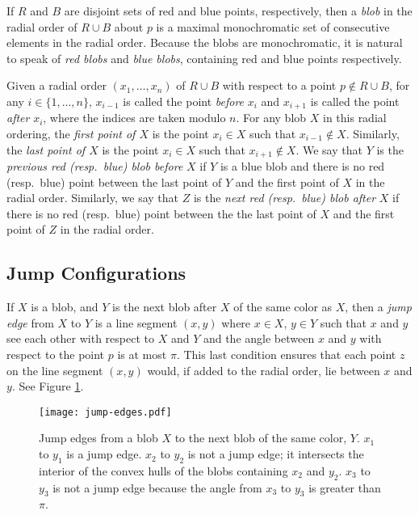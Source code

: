 \documentclass[12pt]{article}
\theoremstyle{definition}
\begin{document}
If $R$ and $B$ are disjoint sets of red and blue points, respectively, then a
\emph{blob} in the radial order of $R\cup B$ about $p$ is a maximal
monochromatic set of consecutive elements in the radial order.
Because the blobs are monochromatic, it is natural to speak of \emph{red blobs} and \emph{blue blobs}, containing red and blue points respectively.

Given a radial order $(x_1,\ldots,x_n)$ of $R\cup B$ with respect to a point $p\not\in R\cup B$, for any $i\in\{1,\ldots,n\}$, $x_{i-1}$ is called the point \emph{before} $x_i$ and $x_{i+1}$ is called the point \emph{after} $x_i$, where the indices are taken modulo $n$.
For any blob $X$ in this radial ordering, the \emph{first point of $X$} is the point $x_i\in X$ such that $x_{i-1}\not\in X$.
Similarly, the \emph{last point of $X$} is the point $x_i \in X$ such that $x_{i+1}\not\in X$.
We say that $Y$ is the \emph{previous red (resp.\ blue) blob before} $X$ if $Y$ is a blue blob and there is no red (resp.\ blue) point between the last point of $Y$ and the first point of $X$ in the radial order.
Similarly, we say that $Z$ is the \emph{next red (resp.\ blue) blob after} $X$ if there is no red (resp.\ blue) point between the the last point of $X$ and the first point of $Z$ in the radial order.

\subsection{Jump Configurations}
If $X$ is a blob, and $Y$ is the next blob after $X$ of the same color as $X$, then a \emph{jump edge} from $X$ to $Y$ is a line segment $(x,y)$ where $x\in X$, $y\in Y$ such that $x$ and $y$ see each other with respect to $X$ and $Y$ and the angle between $x$ and $y$ with respect to the point $p$ is at most $\pi$.
This last condition ensures that each point $z$ on the line segment $(x,y)$ would, if added to the radial order, lie between $x$ and $y$. See Figure \ref{fig:jump-edges}.



\begin{figure}[h]
\centering
\texttt{[image: jump-edges.pdf]}
\caption{Jump edges from a blob $X$ to the next blob of the same color, $Y$. $x_1$ to $y_1$ is a jump edge. $x_2$ to $y_2$ is not a
jump edge; it intersects the interior of the convex hulls of the blobs
containing $x_2$ and $y_2$.
$x_3$ to $y_3$ is not a jump edge because the angle from $x_3$ to $y_3$ is
greater than $\pi$.}
\label{fig:jump-edges}
\end{figure}
\end{document}
